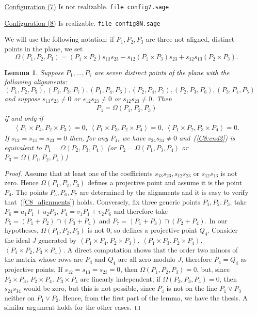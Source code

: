 \documentclass{amsart}
\theoremstyle{plain}
\newtheorem{lemma}{Lemma}[section]
\theoremstyle{definition}
\newcommand{\scl}[2]{\left\langle {#1}, {#2} \right\rangle}
\begin{document}


\underline{Configuration (7)} Is not realizable.
\verb+file config7.sage+



\underline{Configuration (8)} Is realizable.
\verb+file config8N.sage+

We will use the following notation:
if $P_1, P_2, P_3$ are three not aligned, distinct points in the plane,
we set
\[
\Omega(P_1, P_2, P_3) = (P_1 \times P_2)s_{13}s_{23} -
  s_{12}(P_1 \times P_3)s_{23} + s_{12}s_{13}(P_2 \times P_3).
\]

\begin{lemma}
  Suppose $P_1, \dots, P_7$ are seven distinct points of the plane with the
  following alignments:
\begin{equation}
  \label{C8_alignments}
(P_1, P_2, P_5), (P_1, P_3, P_7), (P_1, P_4, P_6), (P_2, P_4, P_7),
(P_2, P_3, P_6),(P_3, P_4, P_5)
\end{equation}
and suppose $s_{13}s_{23} \not = 0$ or $s_{12}s_{23} \not = 0$ or
$s_{12}s_{23} \not = 0$.
Then
\begin{gather}
P_4 = \Omega(P_1, P_2, P_3)
  \label{C8:cnd1}
\end{gather}
if and only if
\begin{gather}
  \label{C8:cnd2}
  \scl{P_1\times P_4}{P_2 \times P_3} = 0,\
  \scl{P_1\times P_3}{P_2 \times P_4} = 0,\
  \scl{P_1\times P_2}{P_3 \times P_4} = 0.
\end{gather}
If $s_{12} = s_{13} = s_{23} = 0$ then, for any $P_4$, we have
$s_{24} s_{34} \not = 0$ and~(\ref{C8:cnd2}) is equivalent to
$P_1 = \Omega(P_2, P_3, P_4)$ (or $P_2 = \Omega(P_1, P_3, P_4)$
or $P_3 = \Omega(P_1, P_2, P_4)$)
\end{lemma}
\begin{proof}
Assume that at least one of the coefficients $s_{13}s_{23}, s_{12}s_{23}$
or $s_{12}s_{13}$ is not zero. Hence $\Omega(P_1, P_2, P_3)$ defines a
projective point and assume it is the point $P_4$. The points $P_5, P_6, P_7$
are determined by the alignments and it is easy to verify
that~(\ref{C8_alignments}) holds.
Conversely, fix three generic points $P_1, P_2, P_3$, take
$P_6 = u_1P_1+u_2P_3$, $P_4 = v_1P_1+v_2P_6$ and therefore take
$P_5 = (P_1+P_2) \cap (P_3+P_4)$ and $P_7 = (P_1+P_3) \cap (P_2+P_4)$.
In our hypotheses, $\Omega(P_1, P_2, P_3)$ is not $0$,
so defines a projective point $Q_4$.  Consider the ideal $J$ generated
by $\scl{P_1\times P_4}{P_2\times P_3}$,
$\scl{P_1\times P_3}{P_2\times P_4}$,
$\scl{P_1\times P_2}{P_3\times P_4}$. A direct computation shows that
the order two minors of the matrix whose rows are $P_4$ and $Q_4$ are all
zero modulo $J$, therefore $P_4 = Q_4$ as projective points.
If $s_{12} = s_{13} = s_{23} = 0$, then $\Omega(P_1, P_2, P_3) = 0$,
but, since $P_2 \times P_3$, $P_2 \times P_4$, $P_3 \times P_4$ are linearly
independent, if $\Omega(P_2, P_3, P_4) = 0$, then $s_{24}s_{34}$ would be
zero, but this is not possible, since $P_4$ is not on the line $P_1\vee P_3$
neither on $P_1\vee P_2$. Hence, from the first part of the lemma, we have the
thesis. A similar argument holds for the other cases.
\end{proof}
\end{document}
